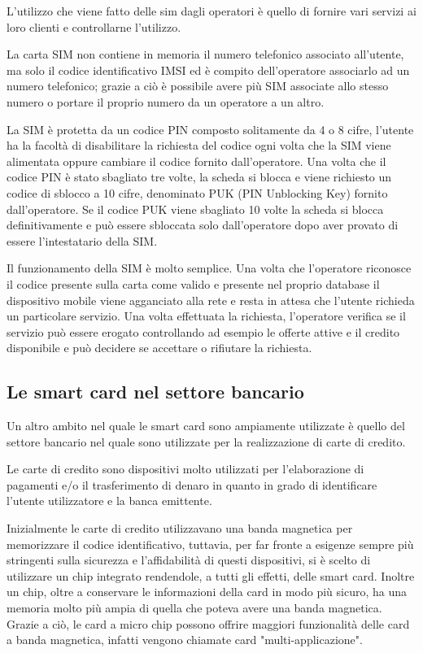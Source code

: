 L'utilizzo che viene fatto delle sim dagli operatori è quello di fornire vari servizi ai loro clienti e controllarne l'utilizzo.

La carta SIM non contiene in memoria il numero telefonico associato all'utente, ma solo il codice identificativo IMSI ed è compito dell'operatore associarlo ad un numero telefonico; grazie a ciò è possibile avere più SIM associate allo stesso numero o portare il proprio numero da un operatore a un altro.

La SIM è protetta da un codice PIN composto solitamente da 4 o 8 cifre, l'utente ha la facoltà di disabilitare la richiesta del codice ogni volta che la SIM viene alimentata oppure cambiare il codice fornito dall'operatore. Una volta che il codice PIN è stato sbagliato tre volte, la scheda si blocca e viene richiesto un codice di sblocco a 10 cifre, denominato PUK (PIN Unblocking Key) fornito dall'operatore. Se il codice PUK viene sbagliato 10 volte la scheda si blocca definitivamente e può essere sbloccata solo dall'operatore dopo aver provato di essere l'intestatario della SIM.

Il funzionamento della SIM è molto semplice. Una volta che l'operatore riconosce il codice presente sulla carta come valido e presente nel proprio database il dispositivo mobile viene agganciato alla rete e resta in attesa che l'utente richieda un particolare servizio. Una volta effettuata la richiesta, l'operatore verifica se il servizio può essere erogato controllando ad esempio le offerte attive e il credito disponibile e può decidere se accettare o rifiutare la richiesta.
\cite{Wiki_sim}

\subsection{Le smart card nel settore bancario}
\label{carta_di_credito}
Un altro ambito nel quale le smart card sono ampiamente utilizzate è quello del settore bancario nel quale sono utilizzate per la realizzazione di carte di credito.

Le carte di credito sono dispositivi molto utilizzati per l'elaborazione di pagamenti e/o il trasferimento di denaro in quanto in grado di identificare l'utente utilizzatore e la banca emittente.

Inizialmente le carte di credito utilizzavano una banda magnetica per memorizzare il codice identificativo, tuttavia, per far fronte a esigenze sempre più stringenti sulla sicurezza e l'affidabilità di questi dispositivi, si è scelto di utilizzare un chip integrato rendendole, a tutti gli effetti, delle smart card. Inoltre un chip, oltre a conservare le informazioni della card in modo più sicuro, ha una memoria molto più ampia di quella che poteva avere una banda magnetica. Grazie a ciò, le card a micro chip possono offrire maggiori funzionalità delle card a banda magnetica, infatti vengono chiamate card "multi-applicazione".


